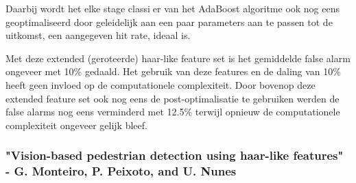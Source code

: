 \documentclass[]{article}
\begin{document}
Daarbij wordt het elke stage classier van het AdaBoost algoritme ook nog eens geoptimaliseerd door geleidelijk aan een paar parameters aan te passen tot de uitkomst, een aangegeven hit rate, ideaal is.

Met deze extended (geroteerde) haar-like feature set is het gemiddelde false alarm ongeveer met 10\% gedaald. Het gebruik van deze features en de daling van 10\% heeft geen invloed op de computationele complexiteit. Door bovenop deze extended feature set ook nog eens de post-optimalisatie te gebruiken werden de false alarms nog eens verminderd met 12.5\% terwijl opnieuw de computationele complexiteit ongeveer gelijk bleef.


\subsubsection*{"Vision-based pedestrian detection using haar-like features" - G. Monteiro, P. Peixoto, and U. Nunes}
\end{document}

